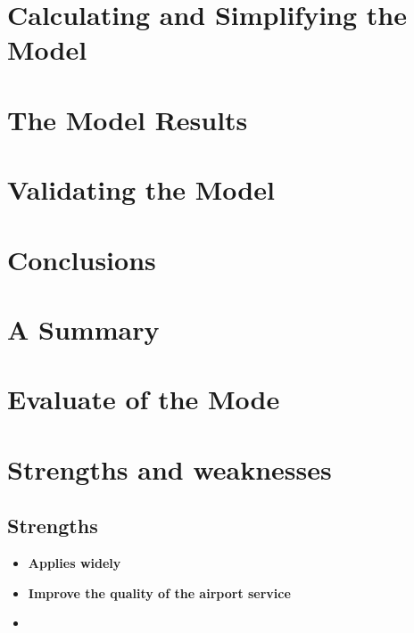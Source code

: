 \documentclass{mcmthesis}
\begin{document}
\section{Calculating and Simplifying the Model  }


\section{The Model Results}


\section{Validating the Model}


\section{Conclusions}

\section{A Summary}


\section{Evaluate of the Mode}

\section{Strengths and weaknesses}


\subsection{Strengths}
\begin{itemize}
\item \textbf{Applies widely}\\

\item \textbf{Improve the quality of the airport service}\\

\item \textbf{}\\
\end{itemize}
\end{document}
